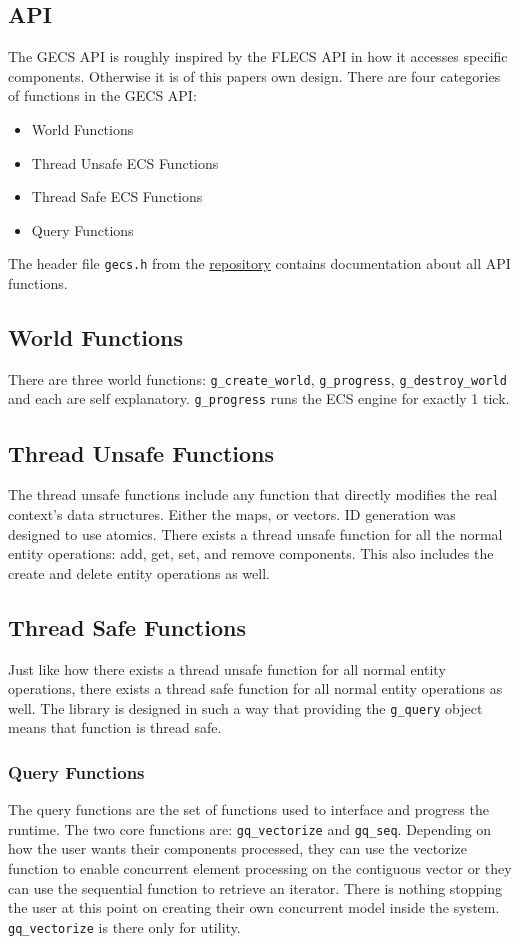 \subsection{API}
The GECS API is roughly inspired by the FLECS API in how it accesses specific components. Otherwise it is of this papers own design. There are four categories of functions in the GECS API:
\begin{itemize}
    \item World Functions
    \item Thread Unsafe ECS Functions
    \item Thread Safe ECS Functions
    \item Query Functions
\end{itemize}

The header file \texttt{gecs.h} from the \href{https://github.com/EmilChoparinov/GECS}{repository} contains documentation about all API functions.

\subsection{World Functions}
There are three world functions: \texttt{g\_create\_world}, \texttt{g\_progress}, \texttt{g\_destroy\_world} and each are self explanatory. \texttt{g\_progress} runs the ECS engine for exactly 1 tick.

\subsection{Thread Unsafe Functions}
The thread unsafe functions include any function that directly modifies the real context's data structures. Either the maps, or vectors. ID generation was designed to use atomics. There exists a thread unsafe function for all the normal entity operations: add, get, set, and remove components. This also includes the create and delete entity operations as well.  

\subsection{Thread Safe Functions}
Just like how there exists a thread unsafe function for all normal entity operations, there exists a thread safe function for all normal entity operations as well. The library is designed in such a way that providing the \texttt{g\_query} object means that function is thread safe.

\subsubsection{Query Functions}
The query functions are the set of functions used to interface and progress the runtime. The two core functions are: \texttt{gq\_vectorize} and \texttt{gq\_seq}. Depending on how the user wants their components processed, they can use the vectorize function to enable concurrent element processing on the contiguous vector or they can use the sequential function to retrieve an iterator. There is nothing stopping the user at this point on creating their own concurrent model inside the system. \texttt{gq\_vectorize} is there only for utility.

